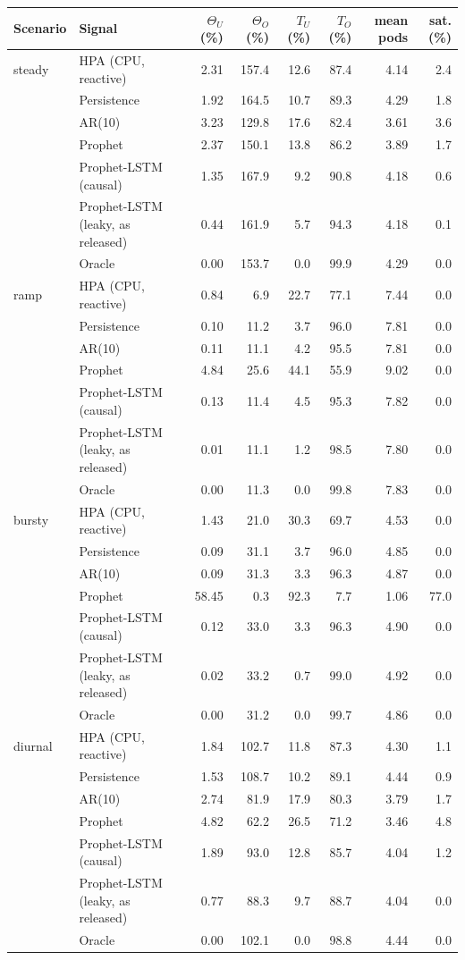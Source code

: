 \begin{tabular}{llrrrrrr}
\toprule
Scenario & Signal & $\Theta_U$ (\%) & $\Theta_O$ (\%) & $T_U$ (\%) & $T_O$ (\%) & mean pods & sat. (\%) \\
\midrule
steady & HPA (CPU, reactive) & 2.31 & 157.4 & 12.6 & 87.4 & 4.14 & 2.4 \\
 & Persistence & 1.92 & 164.5 & 10.7 & 89.3 & 4.29 & 1.8 \\
 & AR(10) & 3.23 & 129.8 & 17.6 & 82.4 & 3.61 & 3.6 \\
 & Prophet & 2.37 & 150.1 & 13.8 & 86.2 & 3.89 & 1.7 \\
 & Prophet-LSTM (causal) & 1.35 & 167.9 & 9.2 & 90.8 & 4.18 & 0.6 \\
 & Prophet-LSTM (leaky, as released) & 0.44 & 161.9 & 5.7 & 94.3 & 4.18 & 0.1 \\
 & Oracle & 0.00 & 153.7 & 0.0 & 99.9 & 4.29 & 0.0 \\
ramp & HPA (CPU, reactive) & 0.84 & 6.9 & 22.7 & 77.1 & 7.44 & 0.0 \\
 & Persistence & 0.10 & 11.2 & 3.7 & 96.0 & 7.81 & 0.0 \\
 & AR(10) & 0.11 & 11.1 & 4.2 & 95.5 & 7.81 & 0.0 \\
 & Prophet & 4.84 & 25.6 & 44.1 & 55.9 & 9.02 & 0.0 \\
 & Prophet-LSTM (causal) & 0.13 & 11.4 & 4.5 & 95.3 & 7.82 & 0.0 \\
 & Prophet-LSTM (leaky, as released) & 0.01 & 11.1 & 1.2 & 98.5 & 7.80 & 0.0 \\
 & Oracle & 0.00 & 11.3 & 0.0 & 99.8 & 7.83 & 0.0 \\
bursty & HPA (CPU, reactive) & 1.43 & 21.0 & 30.3 & 69.7 & 4.53 & 0.0 \\
 & Persistence & 0.09 & 31.1 & 3.7 & 96.0 & 4.85 & 0.0 \\
 & AR(10) & 0.09 & 31.3 & 3.3 & 96.3 & 4.87 & 0.0 \\
 & Prophet & 58.45 & 0.3 & 92.3 & 7.7 & 1.06 & 77.0 \\
 & Prophet-LSTM (causal) & 0.12 & 33.0 & 3.3 & 96.3 & 4.90 & 0.0 \\
 & Prophet-LSTM (leaky, as released) & 0.02 & 33.2 & 0.7 & 99.0 & 4.92 & 0.0 \\
 & Oracle & 0.00 & 31.2 & 0.0 & 99.7 & 4.86 & 0.0 \\
diurnal & HPA (CPU, reactive) & 1.84 & 102.7 & 11.8 & 87.3 & 4.30 & 1.1 \\
 & Persistence & 1.53 & 108.7 & 10.2 & 89.1 & 4.44 & 0.9 \\
 & AR(10) & 2.74 & 81.9 & 17.9 & 80.3 & 3.79 & 1.7 \\
 & Prophet & 4.82 & 62.2 & 26.5 & 71.2 & 3.46 & 4.8 \\
 & Prophet-LSTM (causal) & 1.89 & 93.0 & 12.8 & 85.7 & 4.04 & 1.2 \\
 & Prophet-LSTM (leaky, as released) & 0.77 & 88.3 & 9.7 & 88.7 & 4.04 & 0.0 \\
 & Oracle & 0.00 & 102.1 & 0.0 & 98.8 & 4.44 & 0.0 \\
\bottomrule
\end{tabular}
